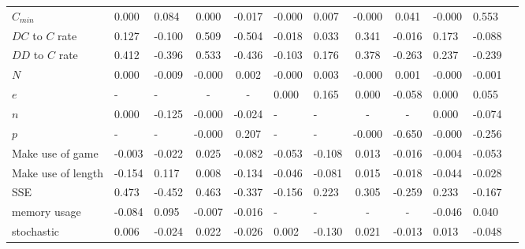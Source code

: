 \begin{tabular}{lggccggccggg}
$C_{min}$            &            0.000 &         0.084 &            0.000 &        -0.017 &           -0.000 &         0.007 &           -0.000 &         0.041 & -0.000 &         0.553\\
$DC$ to $C$ rate     &            0.127 &        -0.100 &            0.509 &        -0.504 &           -0.018 &         0.033 &            0.341 &        -0.016 & 0.173 &        -0.088 \\
$DD$ to $C$ rate     &            0.412 &        -0.396 &            0.533 &        -0.436 &           -0.103 &         0.176 &            0.378 &        -0.263 & 0.237 &        -0.239 \\
$N$                  &            0.000 &        -0.009 &           -0.000 &         0.002 &           -0.000 &         0.003 &           -0.000 &         0.001 & -0.000 &        -0.001 \\
$e$                  &               - &            - &               - &            - &            0.000 &         0.165 &            0.000 &        -0.058 &  0.000 &         0.055 \\
$n$                  &            0.000 &        -0.125 &           -0.000 &        -0.024 &               - &            - &               - &            - &  0.000 &        -0.074 \\
$p$                  &               - &            - &           -0.000 &         0.207 &               - &            - &           -0.000 &        -0.650 & -0.000 &        -0.256 \\
Make use of game     &           -0.003 &        -0.022 &            0.025 &        -0.082 &           -0.053 &        -0.108 &            0.013 &        -0.016 & -0.004 &        -0.053 \\
Make use of length   &           -0.154 &         0.117 &            0.008 &        -0.134 &           -0.046 &        -0.081 &            0.015 &        -0.018 & -0.044 &        -0.028 \\
SSE                  &            0.473 &        -0.452 &            0.463 &        -0.337 &           -0.156 &         0.223 &            0.305 &        -0.259 & 0.233 &        -0.167\\
memory usage         &           -0.084 &         0.095 &           -0.007 &        -0.016 &               - &            - &               - &            - & -0.046 &         0.040\\
stochastic           &            0.006 &        -0.024 &            0.022 &        -0.026 &            0.002 &        -0.130 &            0.021 &        -0.013 & 0.013 &        -0.048 \\
\bottomrule
\end{tabular}
